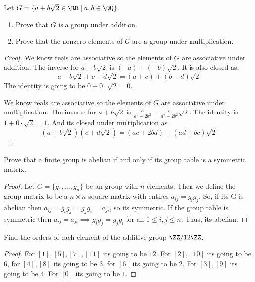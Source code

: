 \begin{problem}
    Let $G = \{a + b\sqrt{2} \in \RR \mid a, b \in \QQ\}$.
    \begin{enumerate}
        \item Prove that $G$ is a group under addition.
        \item Prove that the nonzero elements of $G$ are a group under multiplication. 
    \end{enumerate}
\end{problem}

\begin{proof}
    We know reals are associative so the elements of $G$ are associative under addition. The inverse for $a+b \sqrt{2}$ is $(-a)+(-b)\sqrt{2}$.
    It is also closed as,
    \[ a+b\sqrt{2} + c + d\sqrt{2} = (a+c)+(b+d)\sqrt{2} \]
    The identity is going to  be $0+0\cdot \sqrt{2}=0$.

    We know reals are associative so the elements of $G$ are associative under multiplication. 
    The inverse for $a+b \sqrt{2}$ is $\displaystyle \frac{a}{a^2-2b^2} - \frac{b}{a^2-2b^2} \sqrt{2}$.
    The identity is $1+0 \cdot \sqrt{2}=1$. And its closed under multiplication as 
    \[ (a+b\sqrt{2})(c+d\sqrt{2})= (ac+2bd)+(ad+bc)\sqrt{2} \]
\end{proof}

\begin{problem}
    Prove that a finite group is abelian if and only if its group table is a symmetric matrix.
\end{problem}

\begin{proof}
    Let $G = \{g_1,\ldots,g_n\}$ be an group with $n$ elements. Then we define the group matrix to be a $n \times n$ square matrix 
    with entires $a_{ij} = g_i g_j$. So, if its G is abelian then $a_{ij}=g_i g_j = g_j g_i = a_{ji}$, so its symmetric. 
    If the group table is symmetric then $a_{ij}=a_{ji} \implies g_ig_j = g_jg_i$ for all $1 \le i,j \le n$. Thus, its abelian. 
\end{proof}

\begin{problem}
    Find the orders of each element of the additive group $\ZZ/12\ZZ$.
\end{problem}

\begin{proof}
    For $[1],[5],[7],[11]$ its going to be $12$. For $[2],[10]$ its going to be $6$, for $[4],[8]$ its going to be $3$,
    for $[6]$ its going to be $2$. For $[3],[9]$ its going to be $4$. For $[0]$ its going to be $1$.
\end{proof}

